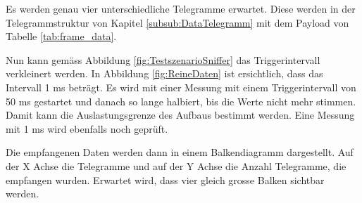 Es werden genau vier unterschiedliche Telegramme erwartet. Diese werden in der Telegrammstruktur von Kapitel \ref{subsub:DataTelegramm} mit dem Payload von Tabelle \ref{tab:frame_data}.

Nun kann gemäss Abbildung \ref{fig:TestszenarioSniffer} das Triggerintervall verkleinert werden. In Abbildung \ref{fig:ReineDaten} ist ersichtlich, dass das Intervall 1 ms beträgt. Es wird mit einer Messung mit einem Triggerintervall von 50 ms gestartet und danach so lange halbiert, bis die Werte nicht mehr stimmen. Damit kann die Auslastungsgrenze des Aufbaus bestimmt werden. Eine Messung mit 1 ms wird ebenfalls noch geprüft.

Die empfangenen Daten werden dann in einem Balkendiagramm dargestellt. Auf der X Achse die Telegramme und auf der Y Achse die Anzahl Telegramme, die empfangen wurden. Erwartet wird, dass vier gleich grosse Balken sichtbar werden.

